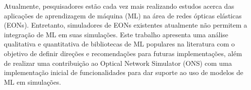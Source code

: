 Atualmente, pesquisadores estão cada vez mais realizando estudos acerca das aplicações de aprendizagem de máquina (ML) na área de redes ópticas elásticas (EONs). Entretanto, simuladores de EONs existentes atualmente não permitem a integração de ML em suas simulações. Este trabalho apresenta uma análise qualitativa e quantitativa de bibliotecas de ML populares na literatura com o objetivo de definir direções e recomendações para futuras implementações, além de realizar uma contribuição ao Optical Network Simulator (ONS) com uma implementação inicial de funcionalidades para dar suporte ao uso de modelos de ML em simulações.